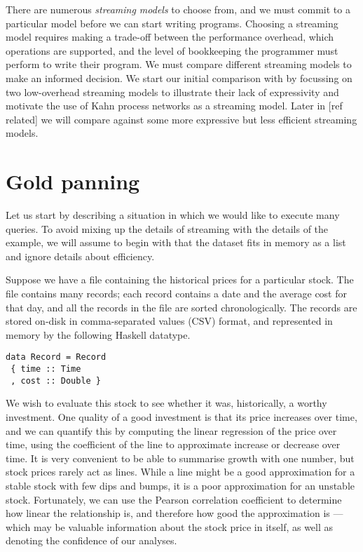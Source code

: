 There are numerous \emph{streaming models} to choose from, and we must commit to a particular model before we can start writing programs.
Choosing a streaming model requires making a trade-off between the performance overhead, which operations are supported, and the level of bookkeeping the programmer must perform to write their program.
We must compare different streaming models to make an informed decision.
We start our initial comparison with by focussing on two low-overhead streaming models to illustrate their lack of expressivity and motivate the use of Kahn process networks as a streaming model.
Later in [ref related] we will compare against some more expressive but less efficient streaming models.

\section{Gold panning}
Let us start by describing a situation in which we would like to execute many queries.
To avoid mixing up the details of streaming with the details of the example, we will assume to begin with that the dataset fits in memory as a list and ignore details about efficiency.

Suppose we have a file containing the historical prices for a particular stock.
The file contains many records; each record contains a date and the average cost for that day, and all the records in the file are sorted chronologically.
The records are stored on-disk in comma-separated values (CSV) format, and represented in memory by the following Haskell datatype.

\begin{lstlisting}
data Record = Record
 { time :: Time
 , cost :: Double }
\end{lstlisting}

We wish to evaluate this stock to see whether it was, historically, a worthy investment.
One quality of a good investment is that its price increases over time, and we can quantify this by computing the linear regression of the price over time, using the coefficient of the line to approximate increase or decrease over time.
It is very convenient to be able to summarise growth with one number, but stock prices rarely act as lines.
While a line might be a good approximation for a stable stock with few dips and bumps, it is a poor approximation for an unstable stock.
Fortunately, we can use the Pearson correlation coefficient to determine how linear the relationship is, and therefore how good the approximation is --- which may be valuable information about the stock price in itself, as well as denoting the confidence of our analyses.

